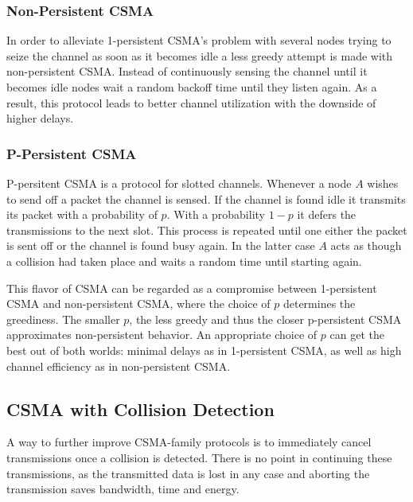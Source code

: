 \subsubsection{Non-Persistent CSMA}

In order to alleviate 1-persistent CSMA's problem with several nodes trying to seize the channel as soon as it becomes idle a less greedy attempt is made with non-persistent CSMA. Instead of continuously sensing the channel until it becomes idle nodes wait a random backoff time until they listen again. As a result, this protocol leads to better channel utilization with the downside of higher delays.

\subsubsection{P-Persistent CSMA}

P-persitent CSMA is a protocol for slotted channels. Whenever a node $A$ wishes to send off a packet the channel is sensed. If the channel is found idle it transmits its packet with a probability of $p$. With a probability $1-p$ it defers the transmissions to the next slot. This process is repeated until one either the packet is sent off or the channel is found busy again. In the latter case $A$ acts as though a collision had taken place and waits a random time until starting again.

This flavor of CSMA can be regarded as a compromise between 1-persistent CSMA and non-persistent CSMA, where the choice of $p$ determines the greediness. The smaller $p$, the less greedy and thus the closer p-persistent CSMA approximates non-persistent behavior. An appropriate choice of $p$ can get the best out of both worlds: minimal delays as in 1-persistent CSMA, as well as high channel efficiency as in non-persistent CSMA.

\subsection{CSMA with Collision Detection}

A way to further improve CSMA-family protocols is to immediately cancel transmissions once a collision is detected. There is no point in continuing these transmissions, as the transmitted data is lost in any case and aborting the transmission saves bandwidth, time and energy. 

